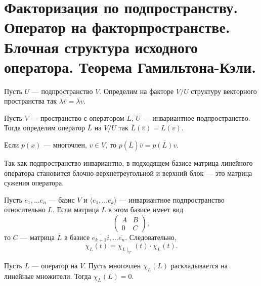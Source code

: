 \section{Факторизация по подпространству. Оператор на факторпространстве. Блочная структура исходного оператора. Теорема Гамильтона-Кэли.}
\begin{defn}
    Пусть $ U$ ---  подпространство $ V$. Определим на факторе  $ V / U$ структуру векторного пространства так  $ \lambda \overline{v} = \overline{ \lambda v}$.
\end{defn}
\begin{defn}
    Пусть $ V$ --- пространство с оператором $ L$,  $ U$ --- инвариантное подпространство. 
    Тогда определим оператор $ \overline{L} $ на $ V / U $ так  $ \overline{L}(\overline{v}) = \overline{L(v)}$.
    \begin{note}
	Если $ p(x) $ --- многочлен, $ v \in V$, то $ p(\overline{L}) \overline{v} = \overline{p(L)v}$.
    \end{note}
\end{defn}
\begin{note}
    Так как подпространство инвариантно, в подходящем базисе матрица линейного оператора становится блочно-верхнетреугольной и верхний блок --- это матрица сужения оператора. 

    Пусть $ e_1, \ldots e_n$ --- базис $ V$ и  $ \langle e_1, \ldots e_k \rangle$ --- инвариантное подпространство относительно $ L$. Если матрица  $ L$ в этом базисе имеет вид 
     \[
    \begin{pmatrix}
	A&B\\0&C
    \end{pmatrix}
    ,\] 
    то $ C$ --- матрица $ \overline{L}$ в базисе $\overline{e_{k+1}i}, \ldots \overline{e_n} $. Следовательно, 
    \[
	\chi_L(t) = \chi_{L \mid_{V'}} (t) \cdot \chi_{\overline{L}}(t)
    .\] 
\end{note}
\begin{thm}
    Пусть $ L$ --- оператор на $ V$. Пусть многочлен  $ \chi_{L}(L)$ раскладывается на линейные множители. Тогда  $ \chi_L(L) = 0$.
\end{thm}

